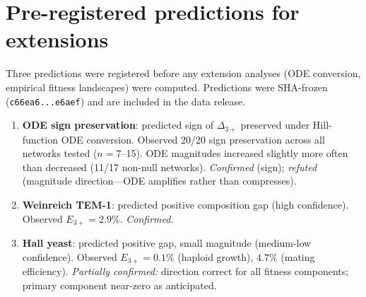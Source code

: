 \documentclass[10pt]{article}
\begin{document}
\appendix
\section{Pre-registered predictions for extensions}
\label{app:prereg}

Three predictions were registered before any extension analyses
(ODE conversion, empirical fitness landscapes) were computed.
Predictions were SHA-frozen
(\texttt{c66ea6...e6aef}) and are included in the data release.

\begin{enumerate}
\item \textbf{ODE sign preservation}: predicted sign of
  $\Delta_{3+}$ preserved under Hill-function ODE conversion.
  Observed 20/20 sign preservation across all networks tested
  ($n = 7$--15). ODE magnitudes increased slightly more often than
  decreased (11/17 non-null networks). \emph{Confirmed} (sign);
  \emph{refuted} (magnitude direction---ODE amplifies rather than
  compresses).

\item \textbf{Weinreich TEM-1}: predicted positive composition
  gap (high confidence). Observed $E_{3+} = 2.9\%$.
  \emph{Confirmed.}

\item \textbf{Hall yeast}: predicted positive gap, small magnitude
  (medium-low confidence). Observed $E_{3+} = 0.1\%$ (haploid
  growth), $4.7\%$ (mating efficiency). \emph{Partially confirmed:}
  direction correct for all fitness components; primary component
  near-zero as anticipated.
\end{enumerate}





\end{document}
